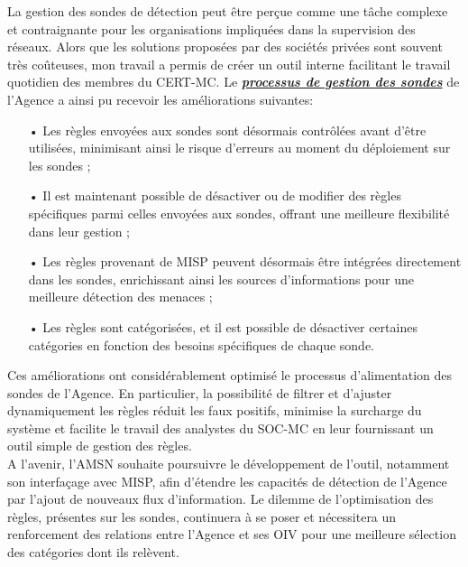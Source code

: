 \vspace{1em}

La gestion des sondes de détection peut être perçue comme une tâche complexe et contraignante pour les organisations impliquées dans la supervision des réseaux. Alors que les solutions proposées par des sociétés privées sont souvent très coûteuses, mon travail a permis de créer un outil interne facilitant le travail quotidien des membres du CERT-MC. Le \hyperref[chap3:intro]{\textit{\textbf{processus de gestion des sondes}}} de l'Agence a ainsi pu recevoir les améliorations suivantes:\\

\vspace{1em}

\begin{itemize}[itemsep=1em]
    \item[•] Les règles envoyées aux sondes sont désormais contrôlées avant d'être utilisées, minimisant ainsi le risque d’erreurs au moment du déploiement sur les sondes ;
    \item[•] Il est maintenant possible de désactiver ou de modifier des règles spécifiques parmi celles envoyées aux sondes, offrant une meilleure flexibilité dans leur gestion ;
    \item[•] Les règles provenant de MISP peuvent désormais être intégrées directement dans les sondes, enrichissant ainsi les sources d’informations pour une meilleure détection des menaces ;
    \item[•] Les règles sont catégorisées, et il est possible de désactiver certaines catégories en fonction des besoins spécifiques de chaque sonde.\\
\end{itemize}

\newpage

Ces améliorations ont considérablement optimisé le processus d'alimentation des sondes de l'Agence.  En particulier, la possibilité de filtrer et d'ajuster dynamiquement les règles réduit les faux positifs, minimise la surcharge du système et facilite le travail des analystes du SOC-MC en leur fournissant un outil simple de gestion des règles.\\

A l'avenir, l'AMSN souhaite poursuivre le développement de l'outil, notamment son interfaçage avec MISP, afin d'étendre les capacités de détection de l'Agence par l'ajout de nouveaux flux d'information. Le dilemme de l'optimisation des règles, présentes sur les sondes, continuera à se poser et nécessitera un renforcement des relations entre l'Agence et ses OIV pour une meilleure sélection des catégories dont ils relèvent.